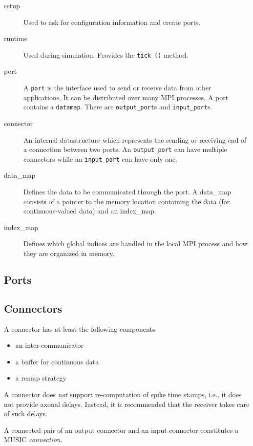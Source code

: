 \documentclass[a4paper]{report}
\begin{document}
\begin{description}
  \item[setup] Used to ask for configuration information and create
    ports.
  \item[runtime] Used during simulation.  Provides the \lstinline|tick ()|
    method.
  \item[port] A \lstinline|port| is the interface used to send or receive
    data from other applications.  It can be distributed over many MPI
    processes.  A port contains a \lstinline|datamap|.  There are
    \lstinline|output_port|s and \lstinline|input_port|s.
  \item[connector] An internal datastructure which represents the
    sending or receiving end of a connection between two ports.  An
    \lstinline|output_port| can have multiple connectors while an
    \lstinline|input_port| can have only one.
  \item[data\_map] Defines the data to be communicated through the
    port.  A data\_map consists of a pointer to the memory location
    containing the data (for continuous-valued data) and an
    index\_map.
  \item[index\_map] Defines which global indices are handled in the
    local MPI process and how they are organized in memory.
\end{description}

\subsection{Ports}

\subsection{Connectors}

A connector has at least the following components:
\begin{itemize}
  \item an inter-communicator
  \item a buffer for continuous data
  \item a remap strategy
\end{itemize}

A connector does \emph{not} support re-computation of spike time
stamps, i.e., it does not provide axonal delays.  Instead, it is
recommended that the receiver takes care of such delays.

A connected pair of an output connector and an input connector
constitutes a MUSIC \emph{connection}.
\end{document}
